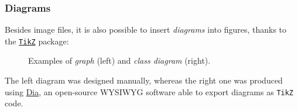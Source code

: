 \documentclass[10pt,    %
    english,            %
    xcolor=table,       %
    envcountsect,       %
    aspectratio=43      %
]{beamer}
\begin{document}
\begin{frame}
    \label{sli:Diagrams}
    \frametitle{Diagrams}
    Besides image files, it is also possible to insert \textit{diagrams} into figures, thanks to the \href{https://ctan.org/pkg/pgf?lang=en}{\texttt{TikZ}} package:

    \vspace{-0.20cm}
    \begin{figure}[H]
        \centering
        \resizebox{0.35\linewidth}{!}{}
        \hspace{0.25cm}\hspace{0.25cm}
        \resizebox{0.45\linewidth}{!}{}
        \vspace{-0.10cm}
        \caption{Examples of \textit{graph} (left) and \textit{class diagram} (right).}
        \label{fig:diagrams}
    \end{figure}
    
    \vspace{-0.50cm}
    The left diagram was designed manually, whereas the right one was produced using \href{http://dia-installer.de}{Dia}, an open-source WYSIWYG software able to export diagrams as \texttt{TikZ} code.
    
    
\end{frame}
    
\end{document}
